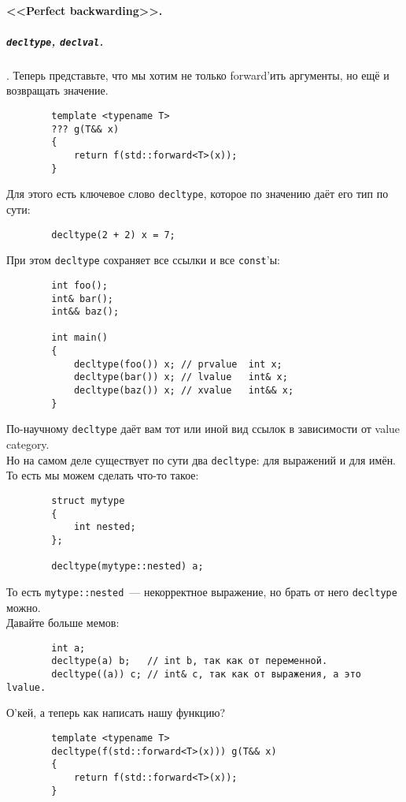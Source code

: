 \documentclass{article}
\begin{document}
    \paragraph{<<Perfect backwarding>>.}
    \subparagraph{\texttt{decltype}, \texttt{declval}.}.
    Теперь представьте, что мы хотим не только forward'ить аргументы, но ещё и возвращать значение.
    \begin{verbatim}
        template <typename T>
        ??? g(T&& x)
        {
            return f(std::forward<T>(x));
        }
    \end{verbatim}
    Для этого есть ключевое слово \texttt{decltype}, которое по значению даёт его тип по сути:
    \begin{verbatim}
        decltype(2 + 2) x = 7;
    \end{verbatim}
    При этом \texttt{decltype} сохраняет все ссылки и все \texttt{const}'ы:
    \begin{verbatim}
        int foo();
        int& bar();
        int&& baz();
        
        int main()
        {
            decltype(foo()) x; // prvalue  int x;
            decltype(bar()) x; // lvalue   int& x;
            decltype(baz()) x; // xvalue   int&& x;
        }
    \end{verbatim}
    По-научному \texttt{decltype} даёт вам тот или иной вид ссылок в зависимости от value category.\\
    Но на самом деле существует по сути два \texttt{decltype}: для выражений и для имён. То есть мы можем сделать что-то такое:
    \begin{verbatim}
        struct mytype
        {
            int nested;
        };

        decltype(mytype::nested) a;
    \end{verbatim}
    То есть \texttt{mytype::nested}~--- некорректное выражение, но брать от него \texttt{decltype} можно.\\
    Давайте больше мемов:
    \begin{verbatim}
        int a;
        decltype(a) b;   // int b, так как от переменной.
        decltype((a)) c; // int& c, так как от выражения, а это lvalue.
    \end{verbatim}
    О'кей, а теперь как написать нашу функцию?
    \begin{verbatim}
        template <typename T>
        decltype(f(std::forward<T>(x))) g(T&& x)
        {
            return f(std::forward<T>(x));
        }
    \end{verbatim}
\end{document}
